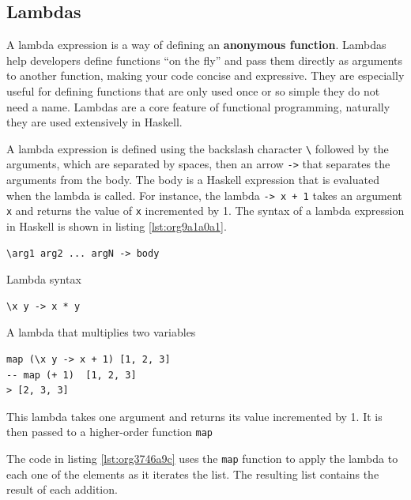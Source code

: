 \documentclass[a4paper, titlepage, twoside]{article}
\begin{document}
\subsection{Lambdas}
\label{sec:orgb6f9b37}

A lambda expression is a way of defining an \textbf{anonymous function}. Lambdas help developers define functions ``on the fly'' and pass them directly as arguments to another function, making your code concise and expressive. They are especially useful for defining functions that are only used once or so simple they do not need a name. Lambdas are a core feature of functional programming, naturally they are used extensively in Haskell.

A lambda expression is defined using the backslash character \texttt{\textbackslash{}} followed by the arguments, which are separated by spaces, then an arrow \texttt{->} that separates the arguments from the body. The body is a Haskell expression that is evaluated when the lambda is called. For instance, the lambda \texttt{\x -> x + 1} takes an argument \texttt{x} and returns the value of \texttt{x} incremented by 1. The syntax of a lambda expression in Haskell is shown in listing \ref{lst:org9a1a0a1}.

\begin{listing}[htbp]
\begin{verbatim}
\arg1 arg2 ... argN -> body
\end{verbatim}
\caption{\label{lst:org9a1a0a1}Lambda syntax}
\end{listing}

\begin{listing}[htbp]
\begin{verbatim}
\x y -> x * y
\end{verbatim}
\caption{A lambda that multiplies two variables}
\end{listing}

\begin{listing}[htbp]
\begin{verbatim}
map (\x y -> x + 1) [1, 2, 3]
-- map (+ 1)  [1, 2, 3]
> [2, 3, 3]
\end{verbatim}
\caption[higher-order lambda]{\label{lst:org3746a9c}This lambda takes one argument and returns its value incremented by 1. It is then passed to a higher-order function \texttt{map}}
\end{listing}

The code in listing \ref{lst:org3746a9c} uses the \texttt{map} function to apply the lambda to each one of the elements as it iterates the list. The resulting list contains the result of each addition.
\end{document}
